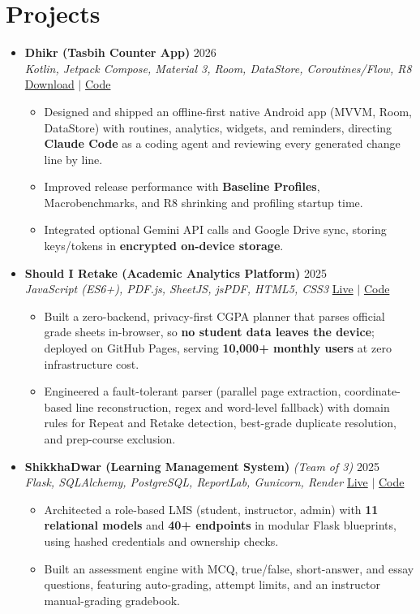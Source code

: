 \documentclass[a4paper]{article}
\newcommand{\resumeItem}[1]{
  \item\small{
    {#1 \vspace{-2pt}}
  }
}
\newcommand{\resumeItemListStart}{\begin{itemize}}
\newcommand{\resumeItemListEnd}{\end{itemize}\vspace{-5pt}}
\begin{document}
\section{Projects}
  \begin{itemize}[leftmargin=0.15in, label={}, itemsep=6pt]

    \item
    \textbf{Dhikr (Tasbih Counter App)} \hfill 2026\\
    \small\textit{Kotlin, Jetpack Compose, Material 3, Room, DataStore, Coroutines/Flow, R8} \hfill
    \href{https://github.com/badhon495/Dhikr/releases}{Download} $|$
    \href{https://github.com/badhon495/Dhikr}{Code}
    \vspace{-5pt}
    \resumeItemListStart
      \resumeItem{Designed and shipped an offline-first native Android app (MVVM, Room, DataStore) with routines, analytics, widgets, and reminders, directing \textbf{Claude Code} as a coding agent and reviewing every generated change line by line.}
      \resumeItem{Improved release performance with \textbf{Baseline Profiles}, Macrobenchmarks, and R8 shrinking and profiling startup time.}
      \resumeItem{Integrated optional Gemini API calls and Google Drive sync, storing keys/tokens in \textbf{encrypted on-device storage}.}
    \resumeItemListEnd

    \item
    \textbf{Should I Retake (Academic Analytics Platform)} \hfill 2025\\
    \small\textit{JavaScript (ES6+), PDF.js, SheetJS, jsPDF, HTML5, CSS3} \hfill
    \href{https://badhon495.github.io/should-i-retake/}{Live} $|$
    \href{https://github.com/badhon495/should-i-retake}{Code}
    \vspace{-5pt}
    \resumeItemListStart
      \resumeItem{Built a zero-backend, privacy-first CGPA planner that parses official grade sheets in-browser, so \textbf{no student data leaves the device}; deployed on GitHub Pages, serving \textbf{10,000+ monthly users} at zero infrastructure cost.}
      \resumeItem{Engineered a fault-tolerant parser (parallel page extraction, coordinate-based line reconstruction, regex and word-level fallback) with domain rules for Repeat and Retake detection, best-grade duplicate resolution, and prep-course exclusion.}
    \resumeItemListEnd

    \item
    \textbf{ShikkhaDwar (Learning Management System)} \textit{\small (Team of 3)} \hfill 2025\\
    \small\textit{Flask, SQLAlchemy, PostgreSQL, ReportLab, Gunicorn, Render} \hfill
    \href{https://shikkhadwar-81r2.onrender.com/}{Live} $|$
    \href{https://github.com/nihal-kabir/ShikkhaDwar}{Code}
    \vspace{-5pt}
    \resumeItemListStart
      \resumeItem{Architected a role-based LMS (student, instructor, admin) with \textbf{11 relational models} and \textbf{40+ endpoints} in modular Flask blueprints, using hashed credentials and ownership checks.}
      \resumeItem{Built an assessment engine with MCQ, true/false, short-answer, and essay questions, featuring auto-grading, attempt limits, and an instructor manual-grading gradebook.}
    \resumeItemListEnd


\end{itemize}
\end{document}
